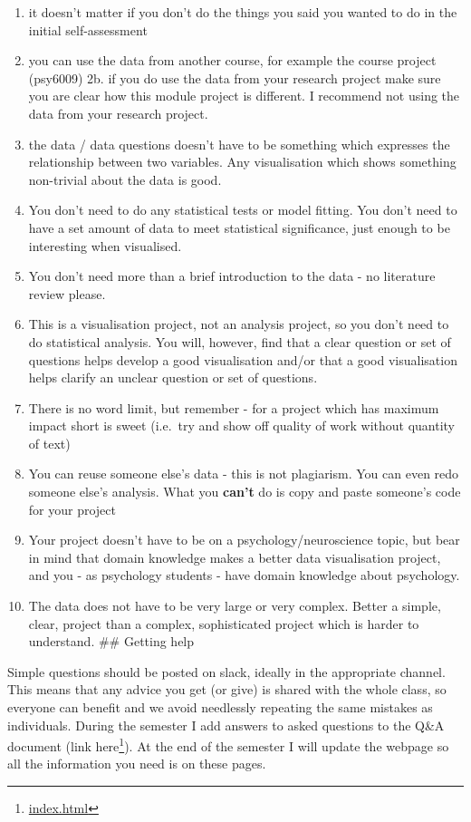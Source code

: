 \documentclass[
  12pt,
  a5paper,
]{book}
\DeclareRobustCommand{\href}[2]{#2\footnote{\url{#1}}}
\providecommand{\tightlist}{%
  \setlength{\itemsep}{0pt}\setlength{\parskip}{0pt}}
\begin{document}
\begin{enumerate}
\def\labelenumi{\arabic{enumi}.}
\tightlist
\item
  it doesn't matter if you don't do the things you said you wanted to do in the initial self-assessment
\item
  you can use the data from another course, for example the course project (psy6009)
  2b. if you do use the data from your research project make sure you are clear how this module project is different. I recommend not using the data from your research project.
\item
  the data / data questions doesn't have to be something which expresses the relationship between two variables. Any visualisation which shows something non-trivial about the data is good.
\item
  You don't need to do any statistical tests or model fitting. You don't need to have a set amount of data to meet statistical significance, just enough to be interesting when visualised.
\item
  You don't need more than a brief introduction to the data - no literature review please.
\item
  This is a visualisation project, not an analysis project, so you don't need to do statistical analysis. You will, however, find that a clear question or set of questions helps develop a good visualisation and/or that a good visualisation helps clarify an unclear question or set of questions.
\item
  There is no word limit, but remember - for a project which has maximum impact short is sweet (i.e.~try and show off quality of work without quantity of text)
\item
  You can reuse someone else's data - this is not plagiarism. You can even redo someone else's analysis. What you \textbf{can't} do is copy and paste someone's code for your project
\item
  Your project doesn't have to be on a psychology/neuroscience topic, but bear in mind that domain knowledge makes a better data visualisation project, and you - as psychology students - have domain knowledge about psychology.
\item
  The data does not have to be very large or very complex. Better a simple, clear, project than a complex, sophisticated project which is harder to understand.
  \#\# Getting help
\end{enumerate}

Simple questions should be posted on slack, ideally in the appropriate channel. This means that any advice you get (or give) is shared with the whole class, so everyone can benefit and we avoid needlessly repeating the same mistakes as individuals. During the semester I add answers to asked questions to the Q\&A document (link \href{index.html}{here}). At the end of the semester I will update the webpage so all the information you need is on these pages.
\end{document}
